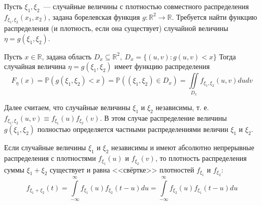 Пусть $\xi_1, \xi_2$~--- случайные величины с плотностью совместного распределения $f_{\xi_{1}, \xi_{2}}\left(x_{1}, x_{2}\right)$, задана борелевская функция $g: \mathbb{R}^{2} \rightarrow \mathbb{R}$. Требуется найти функцию распределения (и плотность, если она существует) случайной величины $\eta=g\left(\xi_{1}, \xi_{2}\right)$.
\begin{lem}
    Пусть $x \in \mathbb{R}$, задана область $D_{x} \subseteq \mathbb{R}^{2},~ D_x = \{(u,v): g(u,v) < x\}$ Тогда случайная величина $\eta=g\left(\xi_{1}, \xi_{2}\right)$ имеет функцию распределения
    \begin{equation*}
        F_{\eta}(x)=\mathbb{P}\left(g\left(\xi_{1}, \xi_{2}\right)<x\right)=\mathbb{P}\left(\left(\xi_{1}, \xi_{2}\right) \in D_{x}\right)=\iint\limits_{D_{x}} f_{\xi_{1}, \xi_{2}}(u, v) d u d v
    \end{equation*}
\end{lem}
Далее считаем, что случайные величины $\xi_1$ и $\xi_2$ независимы, т. е. $f_{\xi_{1}, \xi_{2}}(u, v) \equiv f_{\xi_{1}}(u) f_{\xi_{2}}(v)$. В этом случае распределение величины $g\left(\xi_{1}, \xi_{2}\right)$ полностью определяется частными распределениями величин $\xi_1$ и $\xi_2$.
\begin{namedthm}
    Если случайные величины $\xi_1$ и $\xi_2$ независимы и имеют абсолютно непрерывные распределения с плотностями $f_{\xi_{1}}(u)$ и $f_{\xi_{2}}(v)$, то плотность распределения суммы $\xi_{1}+\xi_{2}$ существует и равна <<свёртке>> плотностей $f_{\xi_{1}}$ и $f_{\xi_{2}}$:
    \begin{equation*}
        f_{\xi_{1}+\xi_{2}}(t)=\int\limits_{-\infty}^{\infty} f_{\xi_{1}}(u) f_{\xi_{2}}(t-u) d u=\int\limits_{-\infty}^{\infty} f_{\xi_{2}}(u) f_{\xi_{1}}(t-u) d u
    \end{equation*}
\end{namedthm}


